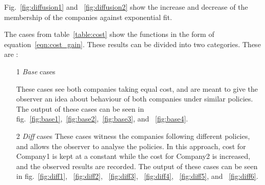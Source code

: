 Fig.~\ref{fig:diffusion1} and ~\ref{fig:diffusion2} show the increase and decrease of the membership of the companies against exponential fit.

The cases from table~\ref{table:cost} show the functions in the form of equation~\ref{eqn:cost_gain}. These results can be divided into two categories. These are :

\begin{enumerate}
\item[1] \emph{Base} cases

These cases see both companies taking equal cost, and are meant to give the observer an idea about behaviour of both companies under similar policies. The output of these cases can be seen in fig.~\ref{fig:base1},~\ref{fig:base2},~\ref{fig:base3}, and ~\ref{fig:base4}.

\item[2] \emph{Diff} cases
These cases witness the companies following different policies, and allows the observer to analyse the policies. In this approach, cost for Company1 is kept at a constant while the cost for Company2 is increased, and the observed results are recorded. 
The output of these cases can be seen in fig.~\ref{fig:diff1}, ~\ref{fig:diff2}, ~\ref{fig:diff3}, ~\ref{fig:diff4}, ~\ref{fig:diff5}, and ~\ref{fig:diff6}. 

\end{enumerate}

